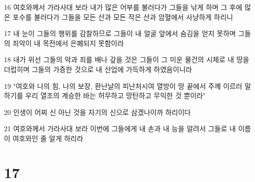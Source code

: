 \par 16 여호와께서 가라사대 보라 내가 많은 어부를 불러다가 그들을 낚게 하며 그 후에 많은 포수를 불러다가 그들을 모든 산과 모든 작은 산과 암혈에서 사냥하게 하리니
\par 17 내 눈이 그들의 행위를 감찰하므로 그들이 내 얼굴 앞에서 숨김을 얻지 못하며 그들의 죄악이 내 목전에서 은폐되지 못함이라
\par 18 내가 위선 그들의 악과 죄를 배나 갚을 것은 그들이 그 미운 물건의 시체로 내 땅을 더럽히며 그들의 가증한 것으로 내 산업에 가득하게 하였음이니라
\par 19 "여호와 나의 힘, 나의 보장, 환난날의 피난처시여 열방이 땅 끝에서 주께 이르러 말하기를 우리 열조의 계승한 바는 허무하고 망탄하고 무익한 것 뿐이라"
\par 20 인생이 어찌 신 아닌 것을 자기의 신으로 삼겠나이까 하리이다
\par 21 여호와께서 가라사대 보라 이번에 그들에게 내 손과 내 능을 알려서 그들로 내 이름이 여호와인 줄 알게 하리라

\chapter{17}

